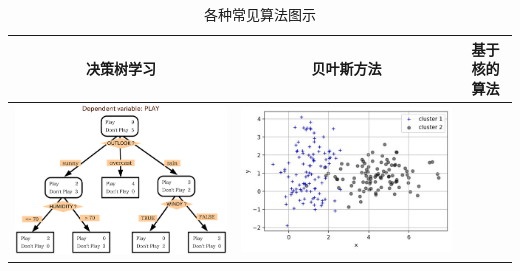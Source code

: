 \begin{longtable}{ccc}
{\begin{minipage}{0.1\linewidth}
\end{minipage}}
\tabularnewline
\bottomrule
\end{longtable}

\begin{longtable}[]{ccc}
  \caption{各种常见算法图示} 
    \label{fig:2.5.3} \\
  \toprule
  决策树学习 & 贝叶斯方法 & 基于核的算法
\tabularnewline
\midrule
\endhead

\begin{minipage}{0.1\linewidth}
  \includegraphics[width=1.0\linewidth]{./img/ch2/dec.png}  
\end{minipage}
&
\begin{minipage}{0.1\linewidth}
  \includegraphics[width=1.0\linewidth]{./img/ch2/sec1/5.jpg}  
\end{minipage}
&
\begin{minipage}{0.1\linewidth}

\end{minipage}
\end{longtable}
